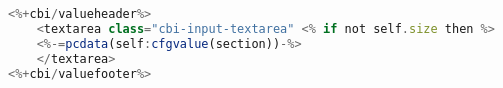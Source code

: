 \begin{lstlisting}[language=javascript,caption={Enhanced Edit Text Box Template}]
<%+cbi/valueheader%>
    <textarea class="cbi-input-textarea" <% if not self.size then %>         style="width: 100%; font: normal 11pt 'Courier New'"<% else %> cols="<%=self.size%>"<% end %> data-update="change"<%= attr("name", cbid) .. attr("id",    cbid) .. ifattr(self.rows, "rows") .. ifattr(self.wrap, "wrap")  ..          ifattr(self.readonly, "readonly") %>>
    <%-=pcdata(self:cfgvalue(section))-%>
    </textarea>
<%+cbi/valuefooter%>
\end{lstlisting}